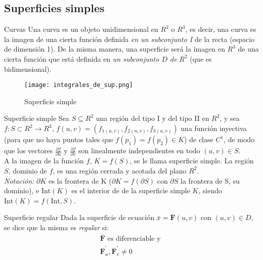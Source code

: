 \documentclass[a4paper, twoside]{article}
\numberwithin{equation}{section}
\numberwithin{figure}{section}
\numberwithin{table}{section}
\newcommand{\vect}[1]{\overline{\textbf{#1}}}
\begin{document}
\subsection{Superficies simples}
\begin{minipage}{0.6\textwidth}
	\begin{definicion*}{Curvas}
		Una curva es un objeto unidimensional en $R^2$ o $R^3$, es decir, una curva es la imagen de una cierta función definida \textit{en un subconjunto I} de la recta (espacio de dimensión 1). De la misma manera, una superficie será la imagen en $R^3$ de una cierta función que está definida en \textit{un subconjunto $D$ de } $R^2$ (que es bidimensional).
	\end{definicion*}
\end{minipage}
\begin{minipage}{0.3\textwidth}
	\begin{figure}[H]
		\begin{center}
			\centering
			\texttt{[image: integrales\_de\_sup.png]}
			\caption{Superficie simple}
		\end{center}
	\end{figure}
\end{minipage}

\begin{definicion*}{Superficie simple}
	Sea $S \subseteq R^2$ una región del tipo I y del tipo II en $R^2$, y sea $f: S \subset R^2 \to R^3$, $f(u,v) = (f_{1(u,v)}, f_{2(u,v)}, f_{3(u,v)})$ una función inyectiva (para que no haya puntos tales que $f(p_1) = f(p_2) \in K$) de clase $C^1$, de modo que los vectores $\frac{\partial f}{\partial u}$ y $\frac{\partial f}{\partial v}$ son linealmente independientes en todo $(u,v)\in S$.\\
	
	A la imagen de la función $f$, $K=f(S)$, se le llama superficie simple. La región $S$, dominio de $f$, es una región cerrada y acotada del plano $R^2$.\\

	\emph{Notación:} $\partial K$ es la frontera de K ($\partial K = f(\partial S)$ con $\partial S$ la frontera de S, su dominio), e $\text{Int}(K)$ es el interior de de la superficie simple $K$, siendo $\text{Int}(K) = f(\text{Int},S)$.
\end{definicion*}

\begin{definicion*}{Superficie regular}
	Dada la superficie de ecuación $\bar{x}=\vect{F}(u,v)$ con $(u,v)\in D$, se dice que la misma es \emph{regular} si:
	\begin{align}
		\vect{F}  \text{ es diferenciable y }\\
		\vect{F}^\prime_u,\vect{F}^\prime_v \neq0
	\end{align}
\end{definicion*}
\end{document}
